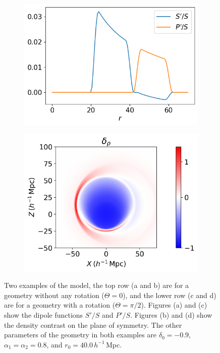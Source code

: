 \documentclass[a4paper,12pt]{report}
\begin{document}
\begin{figure}[!b]
\begin{subfigure}[b]{0.45\textwidth}
        \includegraphics[width=\textwidth]{two structures/rotated/dipole functions.png}
        \caption{}
    \end{subfigure}
    \hfill
    \begin{subfigure}[b]{0.45\textwidth}
        \centering
        \includegraphics[width=\textwidth]{two structures/rotated/density contrast.png}
        \caption{}
    \end{subfigure}
    \caption{Two examples of the model, the top row (a and b) are for a geometry without any rotation ($\Theta = 0$), and the lower row (c and d) are for a geometry with a rotation ($\Theta = \pi/2$). Figures (a) and (c) show the dipole functions $S'/S$ and $P'/S$. Figures (b) and (d) show the density contrast on the plane of symmetry. The other parameters of the geometry in both examples are $\delta_0 = -0.9$, $\alpha_1 = \alpha_2 = 0.8$, and $r_0 = 40.0\, h^{-1}\,$Mpc.}
    \label{fig: two_structures unrotated and rotated example}
\end{figure}
\end{document}
